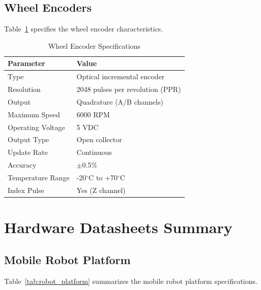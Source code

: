 \subsection{Wheel Encoders}

Table~\ref{tab:encoder_specs} specifies the wheel encoder characteristics.

\begin{table}[htbp]
\centering
\caption{Wheel Encoder Specifications}
\label{tab:encoder_specs}
\begin{tabular}{@{}ll@{}}
\toprule
\textbf{Parameter} & \textbf{Value} \\
\midrule
Type & Optical incremental encoder \\
Resolution & 2048 pulses per revolution (PPR) \\
Output & Quadrature (A/B channels) \\
Maximum Speed & 6000 RPM \\
Operating Voltage & 5 VDC \\
Output Type & Open collector \\
Update Rate & Continuous \\
Accuracy & $\pm$0.5\% \\
Temperature Range & -20$^\circ$C to +70$^\circ$C \\
Index Pulse & Yes (Z channel) \\
\bottomrule
\end{tabular}
\end{table}

\clearpage

\section{Hardware Datasheets Summary}
\label{sec:hardware_datasheets}

\subsection{Mobile Robot Platform}

Table~\ref{tab:robot_platform} summarizes the mobile robot platform specifications.

